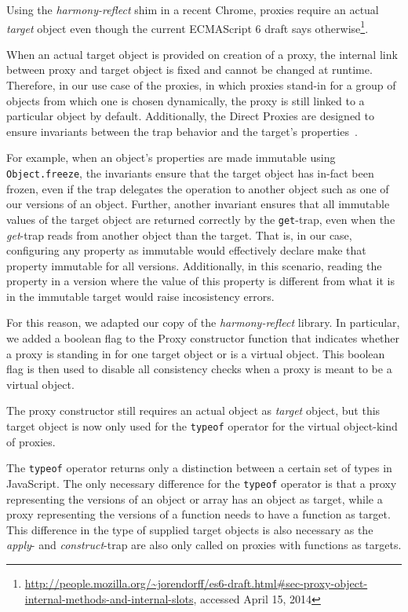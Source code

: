 
Using the \emph{harmony-reflect} shim in a recent Chrome, proxies require an actual \emph{target} object even though the current ECMAScript 6 draft says otherwise\footnote{\url{http://people.mozilla.org/~jorendorff/es6-draft.html\#sec-proxy-object-internal-methods-and-internal-slots}, accessed April 15, 2014}.

When an actual target object is provided on creation of a proxy, the internal link between proxy and target object is fixed and cannot be changed at runtime.
Therefore, in our use case of the proxies, in which proxies stand-in for a group of objects from which one is chosen dynamically, the proxy is still linked to a particular object by default.
Additionally, the Direct Proxies are designed to ensure invariants between the trap behavior and the target's properties~\cite{Cutsem2013TRP}.

For example, when an object's properties are made immutable using \lstinline{Object.freeze}, the invariants ensure that the target object has in-fact been frozen, even if the trap delegates the operation to another object such as one of our versions of an object.
Further, another invariant ensures that all immutable values of the target object are returned correctly by the \lstinline{get}-trap, even when the \emph{get}-trap reads from another object than the target. 
That is, in our case, configuring any property as immutable would effectively declare make that property immutable for all versions.
Additionally, in this scenario, reading the property in a version where the value of this property is different from what it is in the immutable target would raise incosistency errors.

For this reason, we adapted our copy of the \emph{harmony-reflect} library.
In particular, we added a boolean flag to the Proxy constructor function that indicates whether a proxy is standing in for one target object or is a virtual object.
This boolean flag is then used to disable all consistency checks when a proxy is meant to be a virtual object.

The proxy constructor still requires an actual object as \emph{target} object, but this target object is now only used for the \lstinline{typeof} operator for the virtual object-kind of proxies.

The \lstinline{typeof} operator returns only a distinction between a certain set of types in JavaScript.
The only necessary difference for the \lstinline{typeof} operator is that a proxy representing the versions of an object or array has an object as target, while a proxy representing the versions of a function needs to have a function as target.
This difference in the type of supplied target objects is also necessary as the \emph{apply}- and \emph{construct}-trap are also only called on proxies with functions as targets.


